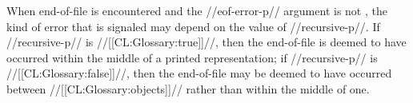  When end-of-file is encountered and the //eof-error-p// argument is not \nil, the kind of error that is signaled may depend on the value of //recursive-p//.  If //recursive-p//  is //[[CL:Glossary:true]]//, then the end-of-file is deemed to have occurred within the middle of a printed representation; if //recursive-p// is //[[CL:Glossary:false]]//, then the end-of-file may be deemed to have occurred between //[[CL:Glossary:objects]]// rather than within the middle of one.

\endlist

\endsubsubsection%

\endsubsection%
